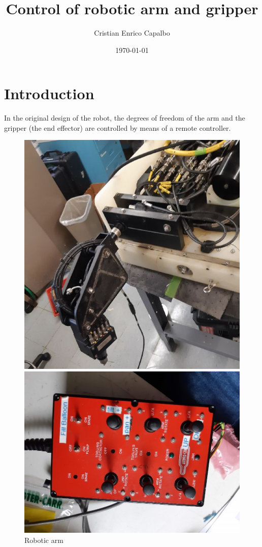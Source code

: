 \documentclass[12pt, a4paper]{article}
\title{Control of robotic arm and gripper}
\author{Cristian Enrico Capalbo}
\date{\today}
\begin{document}
\maketitle
\newpage

\section{Introduction}
In the original design of the robot, the degrees of freedom of the arm and the gripper (the end effector) are controlled by means of a remote controller. 

\begin{figure}[ht]
	\begin{minipage}[b]{0.45\linewidth}
		\centering
		\includegraphics[width=\textwidth]{arm}
		\caption{Robotic arm}
		\label{fig:arm}
	\end{minipage}
	\hspace{0.5cm}
	\begin{minipage}[b]{0.45\linewidth}
		\centering
		\includegraphics[width=\textwidth, angle=-90]{remote.jpg}

\end{minipage}
\end{figure}
\end{document}
